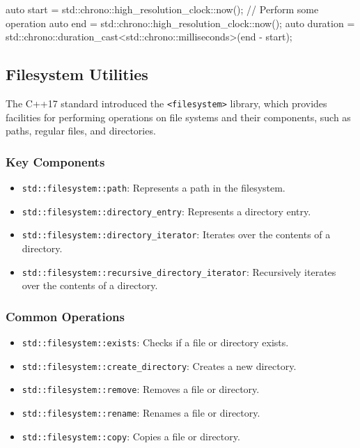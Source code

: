 \begin{exampleblock}
    \begin{codeblock}[language=C++]
auto start = std::chrono::high_resolution_clock::now();
// Perform some operation
auto end = std::chrono::high_resolution_clock::now();
auto duration = std::chrono::duration_cast<std::chrono::milliseconds>(end - start);
    \end{codeblock}
\end{exampleblock}

\subsection{Filesystem Utilities}

The C++17 standard introduced the \texttt{<filesystem>} library, which provides facilities for performing operations on file systems and their components, such as paths, regular files, and directories.

\subsubsection*{Key Components}
\begin{itemize}
    \item \texttt{std::filesystem::path}: Represents a path in the filesystem.
    \item \texttt{std::filesystem::directory\_entry}: Represents a directory entry.
    \item \texttt{std::filesystem::directory\_iterator}: Iterates over the contents of a directory.
    \item \texttt{std::filesystem::recursive\_directory\_iterator}: Recursively iterates over the contents of a directory.
\end{itemize}

\subsubsection*{Common Operations}
\begin{itemize}
    \item \texttt{std::filesystem::exists}: Checks if a file or directory exists.
    \item \texttt{std::filesystem::create\_directory}: Creates a new directory.
    \item \texttt{std::filesystem::remove}: Removes a file or directory.
    \item \texttt{std::filesystem::rename}: Renames a file or directory.
    \item \texttt{std::filesystem::copy}: Copies a file or directory.
\end{itemize}

